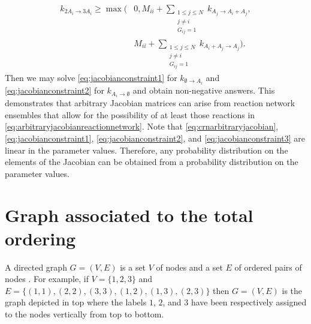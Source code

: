 \begin{equation}
\begin{aligned}
k_{2A_i \to 3A_i} \ge \max \bigg(&0, M_{ii} + \sum_{\substack{1 \le j \le N \\ j \neq i \\ G_{ij} = 1}} k_{A_j \to A_i + A_j}, \\
&M_{ii} + \sum_{\substack{1 \le j \le N \\ j \neq i \\ G_{ij} = 1}} k_{A_i + A_j \to A_j} \bigg).
\end{aligned}
\end{equation}
Then we may solve \ref{eq:jacobianconstraint1} for $k_{\emptyset \to A_i}$ and \ref{eq:jacobianconstraint2} for $k_{A_i \to \emptyset}$ and obtain non-negative answers. This demonstrates that arbitrary Jacobian matrices can arise from reaction network ensembles that allow for the possibility of at least those reactions in \ref{eq:arbitraryjacobianreactionnetwork}. Note that \ref{eq:crnarbitraryjacobian}, \ref{eq:jacobianconstraint1}, \ref{eq:jacobianconstraint2}, and \ref{eq:jacobianconstraint3} are linear in the parameter values. Therefore, any probability distribution on the elements of the Jacobian can be obtained from a probability distribution on the parameter values.

\section{Graph associated to the total ordering}\label{sec:totalordering}

A directed graph $G=(V,E)$ is a set $V$ of nodes and a set $E$ of ordered pairs of nodes \cite{Cormen2009}. For example, if $V = \{1,2,3\}$ and $E = \{(1,1),(2,2),(3,3),(1,2),(1,3),(2,3)\}$ then $G=(V,E)$ is the graph depicted in  top where the labels $1$, $2$, and $3$ have been respectively assigned to the nodes vertically from top to bottom.

